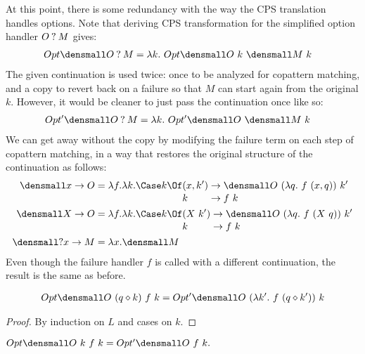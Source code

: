 \documentclass[sigplan,screen]{acmart}
\begin{document}
At this point, there is some redundancy with the way the CPS translation handles
options.  Note that deriving CPS transformation for the simplified option
handler $O \mathbin{?} M$ gives:
\begin{align*}
  Opt\den{O \ask M} &= \lambda k.~ Opt\den{O} ~ k ~ \den{M} ~ k
\end{align*}
The given continuation is used twice: once to be analyzed for copattern
matching, and a copy to revert back on a failure so that $M$ can start again
from the original $k$.  However, it would be cleaner to just pass the
continuation once like so:
\begin{align*}
  Opt'\den{O \ask M} &= \lambda k.~ Opt'\den{O} ~ \den{M} ~ k
\end{align*}
We can get away without the copy by modifying the failure term on each step of
copattern matching, in a way that restores the original structure of the
continuation as follows:
\begin{align*}
  \den{x \to O}
  &=
  \lambda f. \lambda k.
  \Case k \Of
  \begin{alignedat}[t]{2}
    &(x, k') &&\to \den{O} ~ (\lambda q.~ f ~ (x, q)) ~ k'
    \\[-0.5ex]
    &k &&\to f ~ k
  \end{alignedat}
  \\
  \den{X \to O}
  &=
  \lambda f. \lambda k.
  \Case k \Of
  \begin{alignedat}[t]{2}
    &(X ~ k') &&\to \den{O} ~ (\lambda q.~ f ~ (X ~ q)) ~ k'
    \\[-0.5ex]
    &k &&\to f ~ k
  \end{alignedat}
  \\
  \den{\ask x \to M}
  &=
  \lambda x. \den{M}
\end{align*}
Even though the failure handler $f$ is called with a different continuation, the
result is the same as before.
\begin{lemma}
  \begin{align*}
    Opt\den{O} ~ (q \compq k) ~ f ~ k
    =
    Opt'\den{O} ~ (\lambda k'.~ f ~ (q \compq k')) ~ k
  \end{align*}
\end{lemma}
\begin{proof}
  By induction on $L$ and cases on $k$.
\end{proof}
\begin{corollary}
  \begin{math}
    Opt\den{O} ~ k ~ f ~ k
    =
    Opt'\den{O} ~ f ~ k
    .
  \end{math}
\end{corollary}
\end{document}
